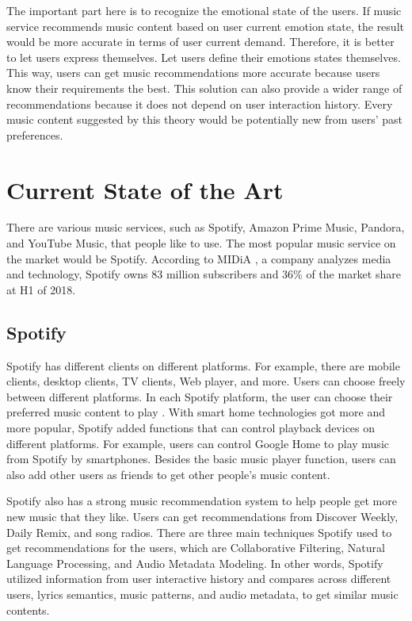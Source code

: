 The important part here is to recognize the emotional state of the users. If music service recommends music content based on user current emotion state, the result would be more accurate in terms of user current demand. Therefore, it is better to let users express themselves. Let users define their emotions states themselves. This way, users can get music recommendations more accurate because users know their requirements the best. This solution can also provide a wider range of recommendations because it does not depend on user interaction history. Every music content suggested by this theory would be potentially new from users' past preferences.

\section{Current State of the Art}
\label{sec:stateofart}

There are various music services, such as Spotify, Amazon Prime Music, Pandora, and YouTube Music, that people like to use. The most popular music service on the market would be Spotify. According to MIDiA \cite{midiaresearch}, a company analyzes media and technology, Spotify owns 83 million subscribers and 36\% of the market share \cite{mulligan2018} at H1 of 2018.

\subsection{Spotify}

Spotify has different clients on different platforms. For example, there are mobile clients, desktop clients, TV clients, Web player, and more. Users can choose freely between different platforms. In each Spotify platform, the user can choose their preferred music content to play \cite{Zhang2013}. With smart home technologies got more and more popular, Spotify added functions that can control playback devices on different platforms. For example, users can control Google Home to play music from Spotify by smartphones. Besides the basic music player function, users can also add other users as friends to get other people's music content.

Spotify also has a strong music recommendation system to help people get more new music that they like. Users can get recommendations from Discover Weekly, Daily Remix, and song radios. There are three main techniques Spotify used to get recommendations for the users, which are Collaborative Filtering, Natural Language Processing, and Audio Metadata Modeling. In other words, Spotify utilized information from user interactive history and compares across different users, lyrics semantics, music patterns, and audio metadata, to get similar music contents.

